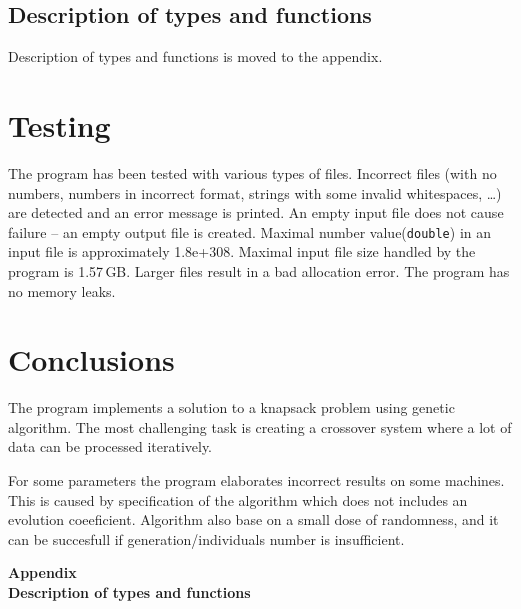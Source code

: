 \documentclass[12pt,a4paper,twoside]{article}
\let\oldmarginpar\marginpar
\renewcommand\marginpar[1]{%
  {\linespread{0.85}\normalfont\scriptsize%
\oldmarginpar[\hspace{1cm}\begin{minipage}{3cm}\raggedleft\scriptsize\color{black}\textsf{#1}\end{minipage}]%
{\hspace{0cm}\begin{minipage}{3cm}\raggedright\scriptsize\color{black}\textsf{#1}\end{minipage}}%
}%
}
\begin{document}
\subsection{Description of types and functions}
Description of types and functions is moved to the appendix.

 

\section{Testing}
The program has been tested with various types of files. Incorrect files (with no numbers, numbers in incorrect format, strings with some invalid whitespaces, \ldots) are detected and an error message is printed. An empty input file does not cause failure – an empty output file is created. Maximal number value(\lstinline!double!) in an input file is approximately 1.8e+308. Maximal input file size handled by the program is \mbox{1.57$\,$GB}. Larger files result in a bad allocation error. The program has no memory leaks.
 


\section{Conclusions}

The program implements a solution to a knapsack problem using genetic algorithm. The most challenging task is creating a crossover system where a lot of data can be processed iteratively.

For some parameters the program elaborates incorrect results on some machines. This is caused by specification of the algorithm which does not includes an evolution coeeficient. Algorithm also base on a small dose of randomness, and it can be succesfull if generation/individuals number is insufficient.





 
 
\cleardoublepage

\rule{0cm}{0cm}

\vfill

\begin{center}
\Huge\bfseries Appendix\\Description of types and functions\par
\end{center}

\vfill 

\rule{0cm}{0cm}
\end{document}
